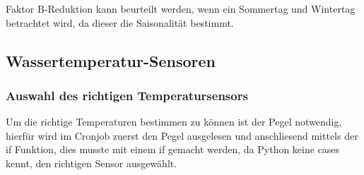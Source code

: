 Faktor B-Reduktion kann beurteilt werden, wenn ein Sommertag und Wintertag betrachtet wird, da dieser die Saisonalität bestimmt.
\subsection{Wassertemperatur-Sensoren}

\subsubsection{Auswahl des richtigen Temperatursensors}
Um die richtige Temperaturen bestimmen zu können ist der Pegel notwendig, hierfür wird im Cronjob zuerst den Pegel ausgelesen und anschliesend mittels der if Funktion, dies musste mit einem if gemacht werden, da Python keine cases kennt, den richtigen Sensor ausgewählt.
